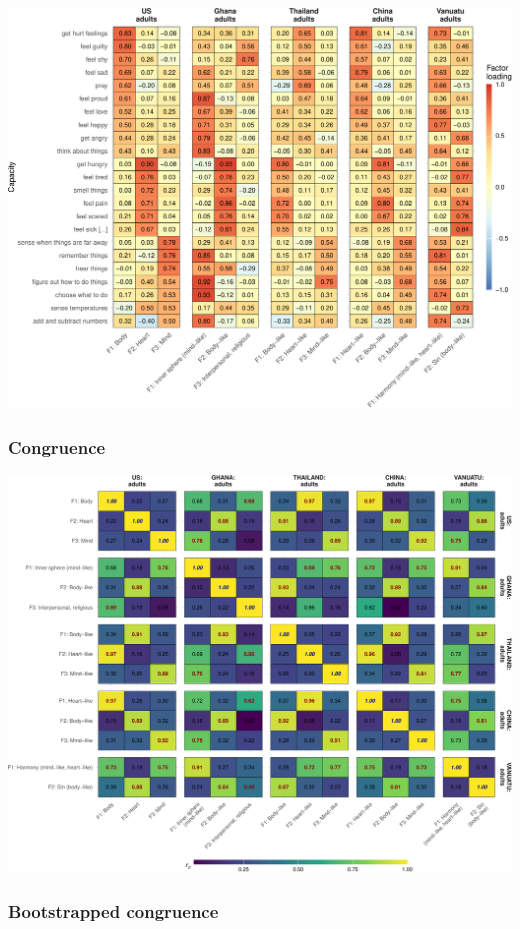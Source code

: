 \documentclass[
  man]{apa6}
\begin{document}
\includegraphics{Script_Re_Weisman_2021_Group1_2024_files/figure-latex/heatmap adults-1.pdf}

\hypertarget{congruence}{%
\subsubsection{Congruence}\label{congruence}}

\includegraphics{Script_Re_Weisman_2021_Group1_2024_files/figure-latex/cong all pairs adults-1.pdf}

\hypertarget{bootstrapped-congruence}{%
\subsubsection{Bootstrapped congruence}\label{bootstrapped-congruence}}
\end{document}
